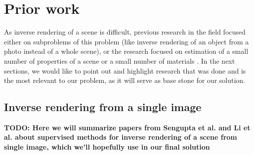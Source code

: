 \chapter{Prior work}
\label{kap:prior}

As inverse rendering of a scene is difficult, previous research in the field focused either on subproblems of this problem (like inverse rendering of an object from a photo instead of a whole scene), or the research focused on estimation of a small number of properties of a scene \cite{li-inverse-rendering} \cite{sengupta-inverse-rendering} or a small number of materials \cite{material-recognition}. In the next sections, we would like to point out and highlight research that was done and is the most relevant to our problem, as it will serve as base stone for our solution.

\section{Inverse rendering from a single image}
\textbf{TODO: Here we will summarize papers from Sengupta et al. \cite{sengupta-inverse-rendering} and Li et al. \cite{li-inverse-rendering} about supervised methods for inverse rendering of a scene from single image, which we'll hopefully use in our final solution }

